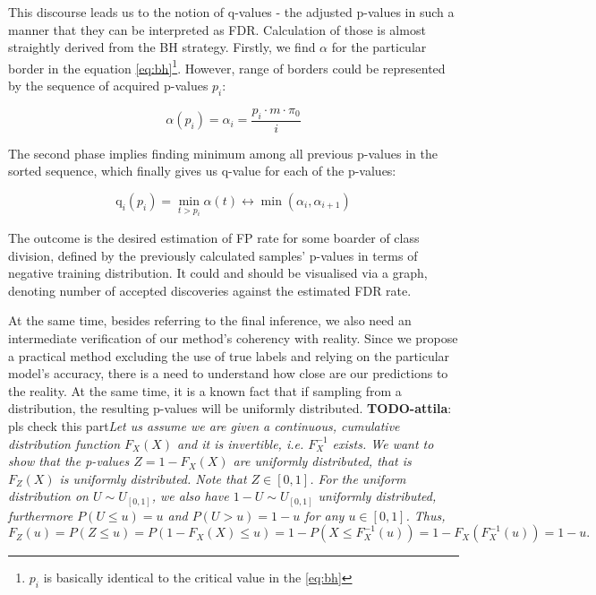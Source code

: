 \documentclass{article}
\newcommand{\todo}[2]{{\color{red} {\bf TODO-#1}: #2}}
\begin{document}
This discourse leads us to the notion of q-values - the adjusted p-values in such a manner that they can be interpreted as FDR. Calculation of those is almost straightly derived from the BH strategy. Firstly, we find $\alpha$ for the particular border in the equation \ref{eq:bh}\footnote{$p_i$ is basically identical to the critical value in the \ref{eq:bh}}. However, range of borders could be represented by the sequence of acquired p-values $p_i$:

\begin{equation}\label{eq:bh2}
    \alpha(p_i) = \alpha_i = \frac{p_i \cdot m \cdot \pi_0}{i}
\end{equation}

The second phase implies finding minimum among all previous p-values in the sorted sequence, which finally gives us q-value for each of the p-values:

    \begin{equation}\label{eq:q}
        \text{q}_{i}(p_{i}) = \min\limits_{t>p_{i}}\alpha(t) \leftrightarrow \min(\alpha_i, \alpha_{i+1})
    \end{equation}

The outcome is the desired estimation of FP rate for some boarder of class division, defined by the previously calculated samples' p-values in terms of negative training distribution. It could and should be visualised via a graph, denoting number of accepted discoveries against the estimated FDR rate. 

At the same time, besides referring to the final inference, we also need an intermediate verification of our method's coherency with reality. Since we propose a practical method excluding the use of true labels and relying on the particular model's accuracy, there is a need to understand how close are our predictions to the reality. At the same time, it is a known fact that if sampling from a distribution, the resulting p-values will be uniformly distributed. \todo{attila}{pls check this part}\textit{Let us assume we are given a continuous, cumulative distribution function $F_X(X)$ and it is invertible, i.e. $F_X^{-1}$ exists. We want to show that the p-values $Z = 1-F_X(X)$ are uniformly distributed, that is $F_Z(X)$ is uniformly distributed. Note that $Z\in [0,1]$. For the uniform distribution on $U\sim U_{[0,1]}$, we also have $1-U\sim U_{[0,1]}$ uniformly distributed, furthermore $P(U\le u)=u$ and $P(U>u) = 1-u$ for any $u\in[0,1]$. Thus,}
\begin{equation}
	F_Z(u)=P(Z \le u) = P(1-F_X(X)\le u)= 1-P(X\le F_X^{-1}(u))=1-F_X(F_X^{-1}(u))=1-u.
\end{equation}
\end{document}
